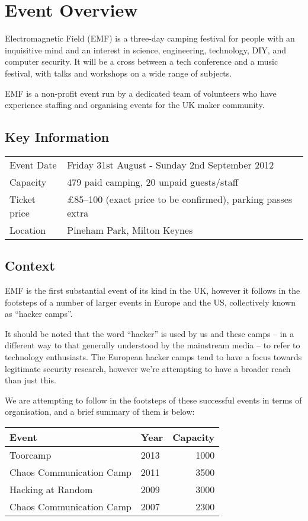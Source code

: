 \section{Event Overview}

Electromagnetic Field (EMF) is a three-day camping festival for people
with an inquisitive mind and an interest in science, engineering,
technology, DIY, and computer security. It will be a cross between a
tech conference and a music festival, with talks and workshops on a wide
range of subjects.

EMF is a non-profit event run by a dedicated team of volunteers who have
experience staffing and organising events for the UK maker community.

\subsection{Key Information}

\begin{tabular}{ l l }
Event Date & Friday 31st August - Sunday 2nd September 2012 \\
Capacity & 479 paid camping, 20 unpaid guests/staff \\
Ticket price & £85--100 (exact price to be confirmed), parking passes extra \\
Location & Pineham Park, Milton Keynes \\
\end{tabular}

\subsection{Context}

EMF is the first substantial event of its kind in the UK, however it
follows in the footsteps of a number of larger events in Europe and the
US, collectively known as ``hacker camps''.

It should be noted that the word ``hacker'' is used by us and these camps
-- in a different way to that generally understood by the
mainstream media -- to refer to technology enthusiasts. The European
hacker camps tend to have a focus towards legitimate security research,
however we're attempting to have a broader reach than just this.

We are attempting to follow in the footsteps of these successful events
in terms of organisation, and a brief summary of them is below:

\begin{tabular}{ l l r }
Event & Year & Capacity \\
\hline
Toorcamp & 2013 & 1000 \\
Chaos Communication Camp & 2011 & 3500 \\
Hacking at Random & 2009 & 3000 \\
Chaos Communication Camp & 2007 & 2300 \\
\end{tabular}

